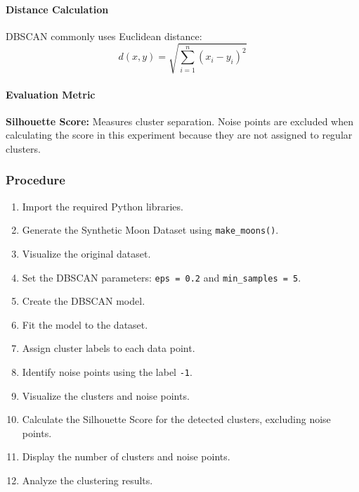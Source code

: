 \documentclass[a4paper,11pt]{article}
\begin{document}
\paragraph{Distance Calculation}
DBSCAN commonly uses Euclidean distance:
\[
d(x, y) = \sqrt{\sum_{i=1}^{n}(x_i - y_i)^2}
\]

\paragraph{Evaluation Metric}
\textbf{Silhouette Score:} Measures cluster separation. Noise points are excluded when calculating the score in this experiment because they are not assigned to regular clusters.

\subsubsection{Procedure}
\begin{enumerate}
    \item Import the required Python libraries.
    \item Generate the Synthetic Moon Dataset using \texttt{make\_moons()}.
    \item Visualize the original dataset.
    \item Set the DBSCAN parameters: \texttt{eps = 0.2} and \texttt{min\_samples = 5}.
    \item Create the DBSCAN model.
    \item Fit the model to the dataset.
    \item Assign cluster labels to each data point.
    \item Identify noise points using the label \texttt{-1}.
    \item Visualize the clusters and noise points.
    \item Calculate the Silhouette Score for the detected clusters, excluding noise points.
    \item Display the number of clusters and noise points.
    \item Analyze the clustering results.
\end{enumerate}
\end{document}
